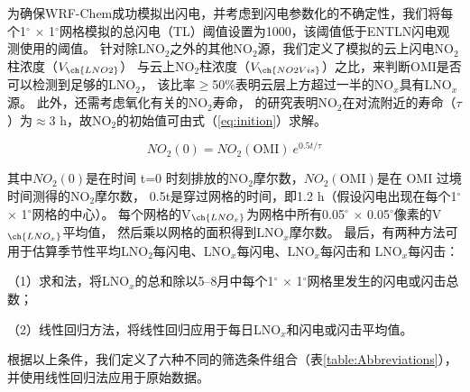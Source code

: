为确保WRF-Chem成功模拟出闪电，并考虑到闪电参数化的不确定性，我们将每个1$^{\circ}$ $\times$ 1$^{\circ}$网格模拟的总闪电（TL）阈值设置为1000，该阈值低于ENTLN闪电观测使用的阈值。
针对除LNO$_2$之外的其他NO$_2$源，我们定义了模拟的云上闪电NO$_2$柱浓度（$V_{\ch{LNO2}}$）
与云上NO$_2$柱浓度（$V_{\ch{NO2Vis}}$）之比，来判断OMI是否可以检测到足够的LNO$_2$，
该比率$\geq$50\%表明云层上方超过一半的NO$_x$具有LNO$_x$源。
此外，还需考虑氧化有关的NO$_2$寿命，
\citet{Nault.2017}的研究表明NO$_2$在对流附近的寿命（$\tau$）为$\approx$3 h，故NO$_2$的初始值可由式（\ref{eq:inition}）求解。

\begin{equation} \label{eq:inition}
NO_2(0) = NO_2(\mathrm{OMI})\ e^{0.5t/\tau}
\end{equation}

其中$NO_2(0)$是在时间 t=0 时刻排放的NO$_2$摩尔数，$NO_2(\mathrm{OMI})$是在 OMI 过境时间测得的NO$_2$摩尔数，
0.5t是穿过网格的时间，即1.2 h（假设闪电出现在每个1$^{\circ}$ $\times$ 1$^{\circ}$网格的中心）。
每个网格的V$_{\ch{LNO_x}}$为网格中所有0.05$^{\circ}$ $\times$ 0.05$^{\circ}$像素的V$_{\ch{LNO_x}}$平均值，
然后乘以网格的面积得到LNO$_x$摩尔数。
最后，有两种方法可用于估算季节性平均LNO$_2$每闪电、LNO$_x$每闪电、LNO$_x$每闪击和 LNO$_x$每闪击：

（1）求和法，将LNO$_x$的总和除以5--8月中每个1$^{\circ}$ $\times$ 1$^{\circ}$网格里发生的闪电或闪击总数；

（2）线性回归方法，将线性回归应用于每日LNO$_x$和闪电或闪击平均值。


根据以上条件，我们定义了六种不同的筛选条件组合（表\ref{table:Abbreviations}），并使用线性回归法应用于原始数据。

